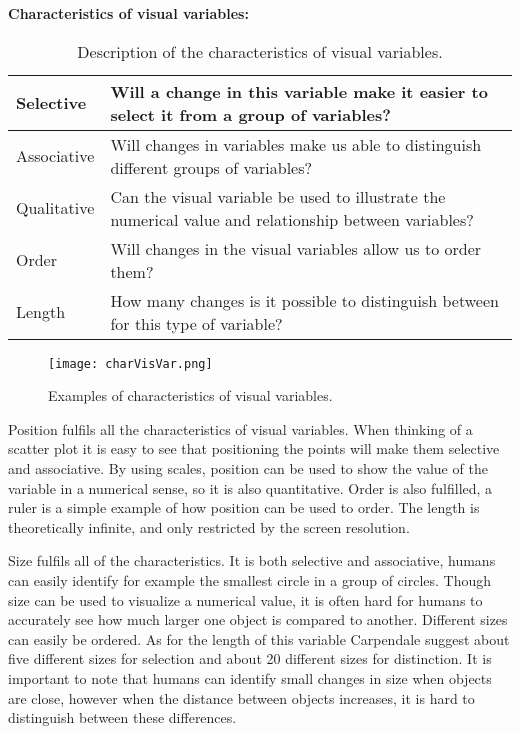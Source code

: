 \textbf{Characteristics of visual variables:}
\begin{table}[h!]
  \begin{tabular}{|l|p{10cm}|}
      \hline
      Selective   & Will a change in this variable make it easier to select it from a group of variables? \\ \hline
        Associative & Will changes in variables make us able to distinguish different groups of variables? \\ \hline 
        Qualitative & Can the visual variable be used to illustrate the numerical value and relationship between variables? \\ \hline
        Order       & Will changes in the visual variables allow us to order them? \\ \hline
        Length      & How many changes is it possible to distinguish between for this type of variable? \\ \hline
    \end{tabular}
    \caption[Characteristics of visual variables]{Description of the characteristics of visual variables.}
\end{table}

\begin{figure}[h!]
	\centering
		\texttt{[image: charVisVar.png]}
		\caption[Characteristics of visual variables]{Examples of characteristics of visual variables.}
		\label{fig:charVisVar}
\end{figure}

Position fulfils all the characteristics of visual variables. When thinking of a scatter plot it is easy to see that positioning the points will make them selective and associative. By using scales, position can be used to show the value of the variable in a numerical sense, so it is also quantitative. Order is also fulfilled, a ruler is a simple example of how position can be used to order. The length is theoretically infinite, and only restricted by the screen resolution.

Size fulfils all of the characteristics. It is both selective and associative, humans can easily identify for example the smallest circle in a group of circles. Though size can be used to visualize a numerical value, it is often hard for humans to accurately see how much larger one object is compared to another. Different sizes can easily be ordered. As for the length of this variable Carpendale suggest about five different sizes for selection and about 20 different sizes for distinction. It is important to note that humans can identify small changes in size when objects are close, however when the distance between objects increases, it is hard to distinguish between these differences.

